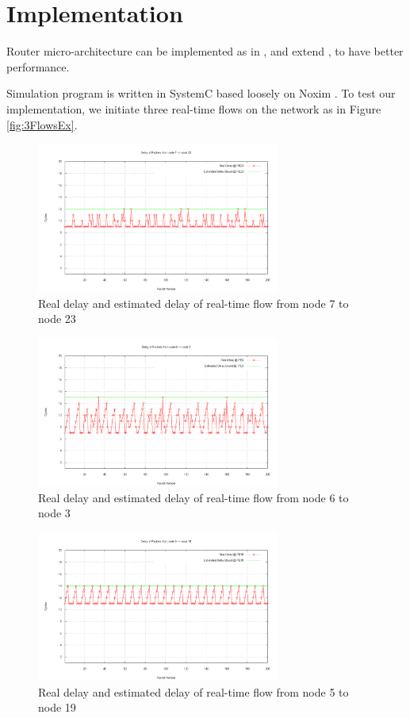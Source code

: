 \documentclass[conference, twocolumn]{IEEEtran}
\theoremstyle{definition}
\begin{document}
\section{Implementation}
Router micro-architecture can be implemented as in
\cite{Rexford98arouter},\cite{ZhangService} and extend \cite{PehDelayModel},
\cite{PehSpecPipeR} to have better performance.

Simulation program is written in SystemC based loosely on Noxim \cite{Noxim}.
To test our implementation, we initiate three real-time flows on the network as
in Figure \ref{fig:3FlowsEx}.

\begin{figure}[htp]
\centering
\includegraphics[width=8cm]{pics/PE23.png}
\caption[Flow from node 7 to node 23.]
{Real delay and estimated delay of real-time flow from node
7 to node 23}\label{fig:PE7PE23}
\end{figure}

\begin{figure}[htp]
\centering
\includegraphics[width=8cm]{pics/PE3.png}
\caption[Three flows example.]
{Real delay and estimated delay of real-time flow from node
6 to node 3}\label{fig:PE6PE3}
\end{figure}

\begin{figure}[htp]
\centering
\includegraphics[width=8cm]{pics/PE19.png}
\caption[Three flows example.]
{Real delay and estimated delay of real-time flow from node
5 to node 19}\label{fig:PE5PE19}
\end{figure}
\end{document}
